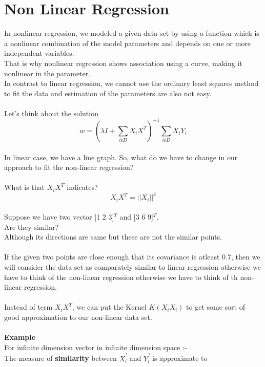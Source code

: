 \documentclass[12pt]{article}
\begin{document}
\section{Non Linear Regression}
In nonlinear regression, we modeled a given data-set by using a function which is a nonlinear combination of the model parameters and depends on one or more independent variables.
\\ That is why nonlinear regression shows association using a curve, making it nonlinear in the parameter.
\\In contrast to linear regression, we cannot use the ordinary least squares method to fit the data and estimation of the parameters are also not easy.
\\
\\Let's think about the solution
\\
\begin{equation}
    w = (\lambda I + \sum\limits_{i\epsilon D} X_i X^T )^{-1} \sum\limits_{i\epsilon D} X_i Y_i
\end{equation}
\\In linear case, we have a line graph. So, what do we have to change in our approach to fit the non-linear regression$?$
\\
\\What is that $X_i X^T$ indicates?
\\
\[
   X_i X^T = ||X_i||^2
\]
\\Suppose we have two vector [1 2 3]$^T$ and [3 6 9]$^T$.
\\Are they similar?
\\Although its directions are same but these are not the similar points.
\\
\\If the given two points are close enough that its covariance is atleast 0.7, then we will consider the data set as comparately similar to linear regression otherwise we have to think of the non-linear regression otherwise we have to think of th non-linear regression.
\\
\\Instead of term $X_i X^T$, we can put the Kernel $K(X_i X_i)$ to get some sort of good approximation to our non-linear data set.
\\
\\ \textbf{Example}
\\ For infinite dimension vector in infinite dimension space :-
\\The measure of \textbf{similarity} between $\vec{X_i}$ and $\vec{Y_i}$ is approximate to
\end{document}
